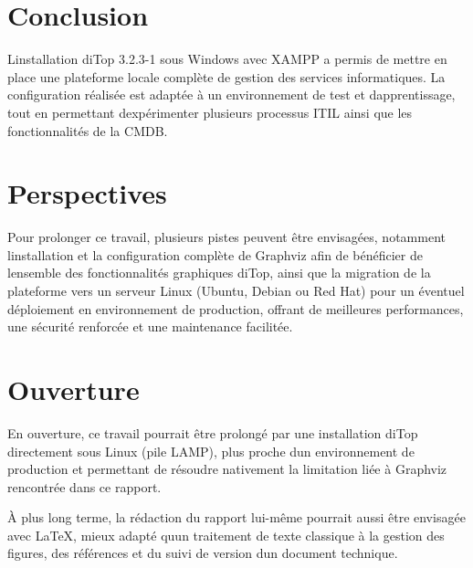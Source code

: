 \chapter*{Conclusion}

L\textquotesingle installation d\textquotesingle iTop 3.2.3-1 sous Windows avec XAMPP a permis de mettre en place une plateforme locale complète de gestion des services informatiques. La configuration réalisée est adaptée à un environnement de test et d\textquotesingle apprentissage, tout en permettant d\textquotesingle expérimenter plusieurs processus ITIL ainsi que les fonctionnalités de la CMDB.


\chapter*{Perspectives}

Pour prolonger ce travail, plusieurs pistes peuvent être envisagées, notamment l\textquotesingle installation et la configuration complète de Graphviz afin de bénéficier de l\textquotesingle ensemble des fonctionnalités graphiques d\textquotesingle iTop, ainsi que la migration de la plateforme vers un serveur Linux (Ubuntu, Debian ou Red Hat) pour un éventuel déploiement en environnement de production, offrant de meilleures performances, une sécurité renforcée et une maintenance facilitée.


\chapter*{Ouverture}

En ouverture, ce travail pourrait être prolongé par une installation d\textquotesingle iTop directement sous Linux (pile LAMP), plus proche d\textquotesingle un environnement de production et permettant de résoudre nativement la limitation liée à Graphviz rencontrée dans ce rapport.

À plus long terme, la rédaction du rapport lui-même pourrait aussi être envisagée avec LaTeX, mieux adapté qu\textquotesingle un traitement de texte classique à la gestion des figures, des références et du suivi de version d\textquotesingle un document technique.

